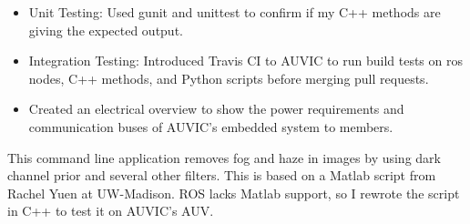 \documentclass[10pt,a4paper,ragged2e,withhyper]{altacv}
\begin{document}
\begin{paracol}{2}

\divider

\begin{itemize}
    \item Unit Testing: Used gunit and unittest to confirm if my C++ methods are giving the expected output.
    \item Integration Testing: Introduced Travis CI to AUVIC to run build tests on ros nodes, C++ methods, and Python scripts before merging pull requests.
    \item Created an electrical overview to show the power requirements and communication buses of AUVIC's embedded system to members.
\end{itemize}

This command line application removes fog and haze in images by using dark channel prior and several other filters. This is based on a Matlab script from Rachel Yuen at UW-Madison. ROS lacks Matlab support, so I rewrote the script in C++ to test it on AUVIC's AUV.

\divider






\end{paracol}
\end{document}
